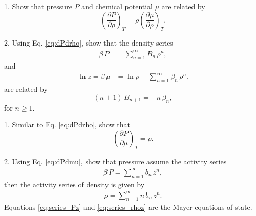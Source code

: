 \documentclass[12pt]{book}
\begin{document}
1. Show that pressure $P$ and chemical potential $\mu$ are related by
\begin{equation}
  \left(
    \frac{ \partial P } { \partial \rho }
  \right)_T
=
  \rho
  \left(
    \frac{ \partial \mu } { \partial \rho }
  \right)_T.
  \label{eq:dPdrho}
\end{equation}



2. Using Eq. \eqref{eq:dPdrho}, show that the density series
\begin{align}
  \beta \, P
&=
  \sum_{n = 1}^\infty B_n \, \rho^n,
  \label{eq:series_Prho}
\end{align}
and
\begin{align}
  \ln z = \beta \, \mu
&=
  \ln \rho - \sum_{n = 1}^\infty \beta_n \, \rho^n.
  \label{eq:series_murho}
\end{align}
are related by
\[
  (n + 1) \, B_{n+1} = -n \, \beta_n,
\]
for $n \ge 1$.





1. Similar to Eq. \eqref{eq:dPdrho}, show that
\begin{equation}
  \left(
    \frac{ \partial P } { \partial \mu }
  \right)_T
=
  \rho.
  \label{eq:dPdmu}
\end{equation}


2. Using Eq. \eqref{eq:dPdmu}, show that pressure assume the activity series
\begin{align}
  \beta \, P = \sum_{n = 1}^\infty b_n \, z^n,
  \label{eq:series_Pz}
\end{align}
then the activity series of density is given by
\begin{align}
  \rho = \sum_{n = 1}^\infty n \, b_n \, z^n.
  \label{eq:series_rhoz}
\end{align}
Equations \eqref{eq:series_Pz} and \eqref{eq:series_rhoz}
are the Mayer equations of state.

\end{document}
